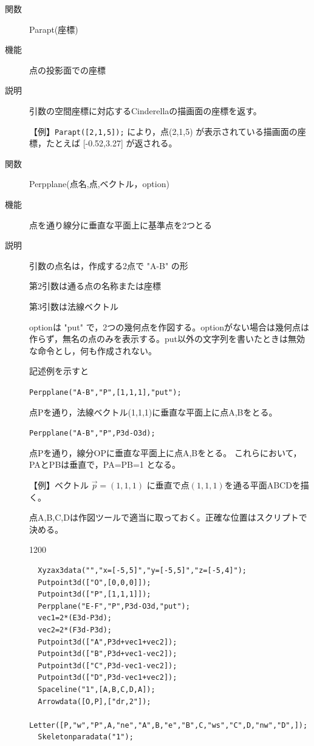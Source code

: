 \documentclass[papersize,a4paper,12pt,uplatex]{jsarticle}
\begin{document}
\begin{description}
\vspace{\baselineskip}
\hypertarget{parapt}{}
\item[関数]  Parapt(座標)
\item[機能]  点の投影面での座標
\item[説明]  引数の空間座標に対応するCinderellaの描画面の座標を返す。

\vspace{\baselineskip}
【例】\verb|Parapt([2,1,5]);| により，点(2,1,5) が表示されている描画面の座標，たとえば [-0.52,3.27]  が返される。

\vspace{\baselineskip}
\hypertarget{perpplane}{}
\item[関数]  Perpplane(点名,点,ベクトル，option)
\item[機能]  点を通り線分に垂直な平面上に基準点を2つとる
\item[説明]  引数の点名は，作成する2点で "A-B" の形

第2引数は通る点の名称または座標
  
第3引数は法線ベクトル
  
optionは "put"  で，2つの幾何点を作図する。optionがない場合は幾何点は作らず，無名の点のみを表示する。put以外の文字列を書いたときは無効な命令とし，何も作成されない。
  
記述例を示すと
  
 \verb|Perpplane("A-B","P",[1,1,1],"put");|
    
点Pを通り，法線ベクトル(1,1,1)に垂直な平面上に点A,Bをとる。

 \verb|Perpplane("A-B","P",P3d-O3d);|
 
 点Pを通り，線分OPに垂直な平面上に点A,Bをとる。
 これらにおいて，PAとPBは垂直で，PA=PB=1 となる。
 
\vspace{\baselineskip}
【例】ベクトル $\vec{p}=(1,1,1)$ に垂直で点$(1,1,1)$を通る平面ABCDを描く。

  点A,B,C,Dは作図ツールで適当に取っておく。正確な位置はスクリプトで決める。

\begin{layer}{120}{0}
\end{layer}

\begin{verbatim}
  Xyzax3data("","x=[-5,5]","y=[-5,5]","z=[-5,4]");
  Putpoint3d(["O",[0,0,0]]);
  Putpoint3d(["P",[1,1,1]]);
  Perpplane("E-F","P",P3d-O3d,"put");
  vec1=2*(E3d-P3d);
  vec2=2*(F3d-P3d);
  Putpoint3d(["A",P3d+vec1+vec2]);
  Putpoint3d(["B",P3d+vec1-vec2]);
  Putpoint3d(["C",P3d-vec1-vec2]);
  Putpoint3d(["D",P3d-vec1+vec2]);
  Spaceline("1",[A,B,C,D,A]);
  Arrowdata([O,P],["dr,2"]);
  Letter([P,"w","P",A,"ne","A",B,"e","B",C,"ws","C",D,"nw","D",]);
  Skeletonparadata("1");
\end{verbatim}



\end{description}
\end{document}
